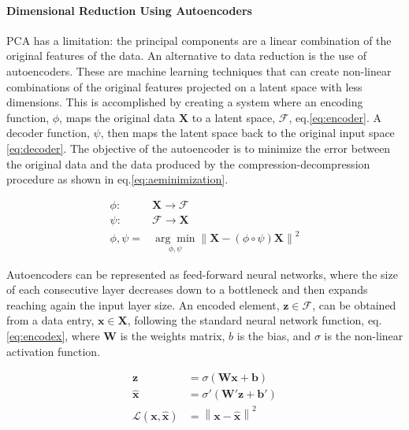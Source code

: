 \paragraph{Dimensional Reduction Using Autoencoders}
PCA has a limitation: the principal components are a linear combination of the original features of the data. An alternative to data reduction is the use of autoencoders. These are machine learning techniques that can create non-linear combinations of the original features projected on a latent space with less dimensions. This is accomplished by creating a system where an encoding function, $\phi$, maps the original data $\boldsymbol{X}$ to a latent space, $\boldsymbol{\mathcal{F}}$, eq.\eqref{eq:encoder}. A decoder function, $\psi$, then maps the latent space back to the original input space \eqref{eq:decoder}. The objective of the autoencoder is to minimize the error between the original data and the data produced by the compression-decompression procedure as shown in eq.\eqref{eq:aeminimization}.

\begin{align}
\phi: & \boldsymbol{X} \rightarrow \boldsymbol{\mathcal{F}} \label{eq:encoder}\\
\psi: & \boldsymbol{\mathcal{F}} \rightarrow \boldsymbol{X} \label{eq:decoder} \\
\phi,\psi = & \underset{\phi,\psi}{\arg \min} \left\lVert \boldsymbol{X} - (\phi \circ \psi) \boldsymbol{X} \right\rVert^2 \label{eq:aeminimization}
\end{align}

Autoencoders can be represented as feed-forward neural networks, where the size of each consecutive layer decreases down to a bottleneck and then expands reaching again the input layer size. An encoded element, $\boldsymbol{z} \in \boldsymbol{\mathcal{F}}$, can be obtained from a data entry, $\boldsymbol{x} \in \boldsymbol{X}$, following the standard neural network function, eq.\eqref{eq:encodex}, where $\boldsymbol{W}$ is the weights matrix, $b$ is the bias, and $\sigma$ is the non-linear activation function.

\begin{align}
\boldsymbol{z} & = \sigma \left( \boldsymbol{W}\boldsymbol{x} + \boldsymbol{b} \right) \label{eq:encodex} \\
\boldsymbol{\hat{x}} & = \sigma' \left( \boldsymbol{W'}\boldsymbol{z} + \boldsymbol{b'} \right) \label{eq:decodez} \\ 
\mathcal{L}(\boldsymbol{x}, \boldsymbol{\hat{x}}) & =  \left\lVert \boldsymbol{x}- \boldsymbol{\hat{x}} \right\rVert^2 \label{eq:aeloss}
\end{align}

